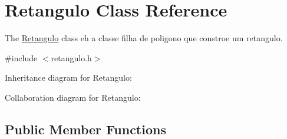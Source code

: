 \hypertarget{classRetangulo}{}\section{Retangulo Class Reference}
\label{classRetangulo}


The \hyperlink{classRetangulo}{Retangulo} class eh a classe filha de poligono que constroe um retangulo.  




{\ttfamily \#include $<$retangulo.\+h$>$}



Inheritance diagram for Retangulo\+:


Collaboration diagram for Retangulo\+:
\subsection*{Public Member Functions}
